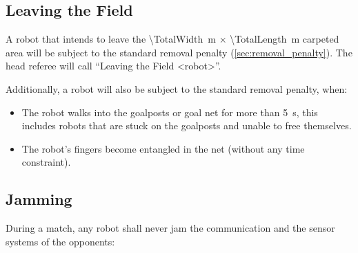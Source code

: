 \subsection{Leaving the Field}
\label{sec:leaving_field}

A robot that intends to leave the \qty{\TotalWidth}{\metre} $\times$ \qty{\TotalLength}{\metre} carpeted area will be subject to the standard removal penalty (\cf \cref{sec:removal_penalty}).
The head referee will call ``Leaving the Field \textless robot\textgreater''.

Additionally, a robot will also be subject to the standard removal penalty, when:

\begin{itemize}
  \item The robot walks into the goalposts or goal net for more than \qty{5}{\second}, this includes robots that are stuck on the goalposts and unable to free themselves.
  \item The robot's fingers become entangled in the net (without any time constraint).
\end{itemize}


\subsection{Jamming}
\label{sec:jamming}
During a match, any robot shall never jam the communication and the sensor systems of the opponents:

